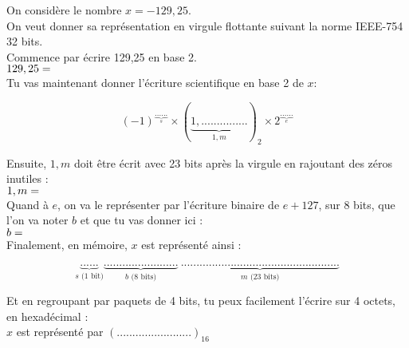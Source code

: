 \documentclass[a4paper,12pt,french]{article}
\begin{document}

On considère le nombre $x=-129,25$.\\

On veut donner sa représentation en virgule flottante suivant la norme IEEE-754 32 bits.\\

Commence par écrire 129,25 en base 2.\\

$129,25 =\dotfill$\\

Tu vas maintenant donner l'écriture scientifique en base 2 de $x$:\LARGE

	$$(-1)^{\underbrace{......}_s}\times \left(\underbrace{1,...............}_{1,m}\right)_2\times 2^{\underbrace{......}_{e}}$$\normalsize


Ensuite, $1,m$ doit être écrit avec 23 bits après la virgule en rajoutant des zéros inutiles :\\


$1,m=\dotfill$\\


Quand à $e$, on va le représenter par l'écriture binaire de $e+127$, sur 8 bits, que l'on va noter $b$ et que tu vas donner ici :\\

$b = \dotfill$\\

Finalement, en mémoire, $x$ est représenté ainsi :

\LARGE
$$\underbrace{......}_{s\text{ (1 bit)}}\underbrace{........................}_{b \text{ (8 bits)}}\ \underbrace{...................................................}_{m \text{ (23 bits)}}$$

\normalsize
Et en regroupant par paquets de 4 bits, tu peux facilement l'écrire sur 4 octets, en hexadécimal :\\

$x$ est représenté par $\left(........................\right)_{16}$
\end{document}
